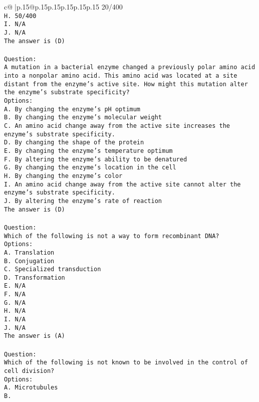 \documentclass{article}
\begin{document}
{\begin{supertabular}{c@{$\;$}|p{.15\linewidth}@{}p{.15\linewidth}p{.15\linewidth}p{.15\linewidth}p{.15\linewidth}p{.15\linewidth}}
{{{20/400\\ \tt H. 50/400\\ \tt I. N/A\\ \tt J. N/A\\ \tt The answer is (D)\\ \tt \\ \tt Question:\\ \tt A mutation in a bacterial enzyme changed a previously polar amino acid into a nonpolar amino acid. This amino acid was located at a site distant from the enzyme’s active site. How might this mutation alter the enzyme’s substrate specificity?\\ \tt Options:\\ \tt A. By changing the enzyme’s pH optimum\\ \tt B. By changing the enzyme's molecular weight\\ \tt C. An amino acid change away from the active site increases the enzyme's substrate specificity.\\ \tt D. By changing the shape of the protein\\ \tt E. By changing the enzyme's temperature optimum\\ \tt F. By altering the enzyme's ability to be denatured\\ \tt G. By changing the enzyme’s location in the cell\\ \tt H. By changing the enzyme's color\\ \tt I. An amino acid change away from the active site cannot alter the enzyme’s substrate specificity.\\ \tt J. By altering the enzyme's rate of reaction\\ \tt The answer is (D)\\ \tt \\ \tt Question:\\ \tt Which of the following is not a way to form recombinant DNA?\\ \tt Options:\\ \tt A. Translation\\ \tt B. Conjugation\\ \tt C. Specialized transduction\\ \tt D. Transformation\\ \tt E. N/A\\ \tt F. N/A\\ \tt G. N/A\\ \tt H. N/A\\ \tt I. N/A\\ \tt J. N/A\\ \tt The answer is (A)\\ \tt \\ \tt Question:\\ \tt Which of the following is not known to be involved in the control of cell division?\\ \tt Options:\\ \tt A. Microtubules\\ \tt B. }}}
\end{supertabular}}
\end{document}

